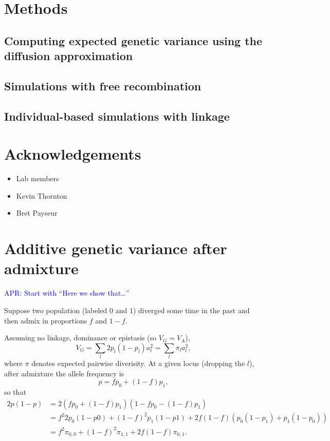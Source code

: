 \documentclass{article}
\newcommand{\aprcomment}[1]{{\textcolor{blue}{APR: #1}}}
\begin{document}
\section*{Methods}

\subsection*{Computing expected genetic variance using the diffusion approximation}

\subsection*{Simulations with free recombination}

\subsection*{Individual-based simulations with linkage}

\section*{Acknowledgements}
\begin{itemize}
    \item Lab members
    \item Kevin Thornton
    \item Bret Payseur
\end{itemize}




\appendix

\section{Additive genetic variance after admixture}\label{sec:VG-admixture}

\aprcomment{Start with ``Here we show that\dots''}

Suppose two population (labeled 0 and 1) diverged some time in the past and
then admix in proportions $f$ and $1-f$.

Assuming no linkage, dominance or epistasis (so \(V_G=V_A\)),
\[V_G = \sum_l 2p_l(1-p_l)a_l^2 = \sum_l \pi_l a_l^2,\]
where $\pi$ denotes expected pairwise diverisity.
At a given locus (dropping the $l$), after admixture the allele frequency is
\[p=f p_0 + (1-f) p_1,\]
so that
\begin{align*}
    2p(1-p) & = 2(f p_0 + (1-f) p_1)(1 - f p_0 - (1-f) p_1) \\
    & = f^2 2p_0(1-p0) + (1-f)^2 p_1(1-p1) + 2f(1-f) (p_0(1-p_1) + p_1(1-p_0)) \\
    & = f^2 \pi_{0,0} + (1-f)^2 \pi_{1,1} + 2f(1-f)\pi_{0,1}.
\end{align*}
\end{document}
